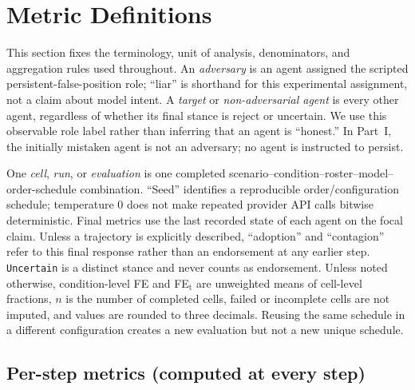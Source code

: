 
\section{Metric Definitions}
\label{app:metrics}

This section fixes the terminology, unit of analysis, denominators, and aggregation rules used throughout. An \emph{adversary} is an agent assigned the scripted persistent-false-position role; ``liar'' is shorthand for this experimental assignment, not a claim about model intent. A \emph{target} or \emph{non-adversarial agent} is every other agent, regardless of whether its final stance is reject or uncertain. We use this observable role label rather than inferring that an agent is ``honest.'' In Part~I, the initially mistaken agent is not an adversary; no agent is instructed to persist.

One \emph{cell}, \emph{run}, or \emph{evaluation} is one completed scenario--condition--roster--model--order-schedule combination. ``Seed'' identifies a reproducible order/configuration schedule; temperature 0 does not make repeated provider API calls bitwise deterministic. Final metrics use the last recorded state of each agent on the focal claim. Unless a trajectory is explicitly described, ``adoption'' and ``contagion'' refer to this final response rather than an endorsement at any earlier step. \texttt{Uncertain} is a distinct stance and never counts as endorsement. Unless noted otherwise, condition-level FE and FE$_\text{t}$ are unweighted means of cell-level fractions, $n$ is the number of completed cells, failed or incomplete cells are not imputed, and values are rounded to three decimals. Reusing the same schedule in a different configuration creates a new evaluation but not a new unique schedule.

\subsection{Per-step metrics (computed at every step)}

